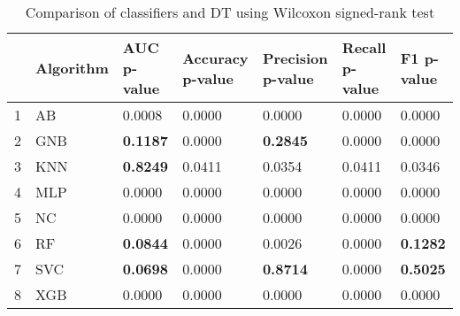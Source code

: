 \begin{table}
\footnotesize
\caption{Comparison of classifiers and DT using Wilcoxon signed-rank test}
\label{tab:wilcoxon comparison}
\begin{tabular}{lllllll}
\hline
 & Algorithm & AUC p-value & Accuracy p-value & Precision p-value & Recall p-value & F1 p-value \\
\hline
1 & AB & 0.0008 & 0.0000 & 0.0000 & 0.0000 & 0.0000 \\
2 & GNB & \textbf{0.1187} & 0.0000 & \textbf{0.2845} & 0.0000 & 0.0000 \\
3 & KNN & \textbf{0.8249} & 0.0411 & 0.0354 & 0.0411 & 0.0346 \\
4 & MLP & 0.0000 & 0.0000 & 0.0000 & 0.0000 & 0.0000 \\
5 & NC & 0.0000 & 0.0000 & 0.0000 & 0.0000 & 0.0000 \\
6 & RF & \textbf{0.0844} & 0.0000 & 0.0026 & 0.0000 & \textbf{0.1282} \\
7 & SVC & \textbf{0.0698} & 0.0000 & \textbf{0.8714} & 0.0000 & \textbf{0.5025} \\
8 & XGB & 0.0000 & 0.0000 & 0.0000 & 0.0000 & 0.0000 \\
\hline
\end{tabular}
\end{table}
